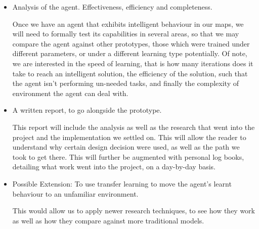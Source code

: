 \documentclass[12pt]{article}
\begin{document}
\begin{itemize}
    \item Analysis of the agent. Effectiveness, efficiency and completeness.

          Once we have an agent that exhibits intelligent behaviour in our maps,
          we will need to formally test its capabilities in several areas, so
          that we may compare the agent against other prototypes, those
          which were trained under different parameters, or under a different
          learning type potentially. Of note, we are interested in the speed
          of learning, that is how many iterations does it take to reach an
          intelligent solution, the efficiency of the solution, such that the
          agent isn’t performing un-needed tasks, and finally the
          complexity of environment the agent can deal with.

    \item A written report, to go alongside the prototype.

          This report will include the analysis as well as the research that
          went into the project and the implementation we settled on.
          This will allow the reader to understand why certain design
          decision were used, as well as the path we took to get there.
          This will further be augmented with personal log books,
          detailing what work went into the project, on a day-by-day basis.

    \item Possible Extension: To use transfer learning to move the agent’s
          learnt behaviour to an unfamiliar environment.

          This would allow us to apply newer research techniques,
          to see how they work as well as how they compare against
          more traditional models.
\end{itemize}
\end{document}
